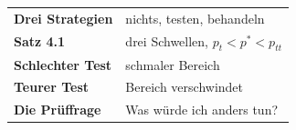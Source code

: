\begin{merksatz}
\begin{center}
\renewcommand{\arraystretch}{1.5}
\begin{tabular}{@{}P{3.0cm}P{5.6cm}@{}}
\toprule
\textbf{Drei Strategien} & nichts, testen, behandeln\\
\textbf{Satz 4.1} & drei Schwellen, $p_t < p^{*} < p_{tt}$\\
\textbf{Schlechter Test} & schmaler Bereich\\
\textbf{Teurer Test} & Bereich verschwindet\\
\textbf{Die Prüffrage} & Was würde ich anders tun?\\
\bottomrule
\end{tabular}
\end{center}

\begin{center}
\begin{minipage}{0.88\textwidth}
\end{minipage}
\end{center}
\end{merksatz}
